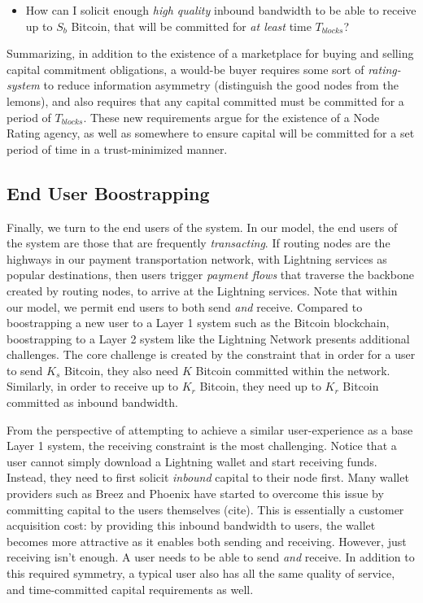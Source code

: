 \documentclass[10pt,a4paper]{article}
\theoremstyle{definition}
\begin{document}
\begin{itemize}
        \item How can I solicit enough \emph{high quality} inbound bandwidth
             to be able to receive up to $S_b$ Bitcoin, that
            will be committed for \emph{at least} time $T_{blocks}$? 
\end{itemize} 

Summarizing, in addition to the existence of a marketplace for buying and selling
capital commitment obligations, a would-be buyer requires some sort of
\emph{rating-system} to reduce information asymmetry (distinguish the good
nodes from the lemons), and also requires that any capital committed must be
committed for a period of $T_{blocks}$. These new requirements argue for the
existence of a Node Rating agency, as well as somewhere to ensure capital will
be committed for a set period of time in a trust-minimized manner. 


\subsection{End User Boostrapping}

Finally, we turn to the end users of the system. In our model, the end users of
the system are those that are frequently \emph{transacting}. If routing nodes
are the highways in our payment transportation network, with Lightning
services as popular destinations, then users trigger \emph{payment flows} that
traverse the backbone created by routing nodes, to arrive at the Lightning
services. Note that within our model, we permit end users to both send
\emph{and} receive. Compared to boostrapping a new user to a Layer 1 system
such as the Bitcoin blockchain, boostrapping to a Layer 2 system like the
Lightning Network presents additional challenges. The core challenge is created
by the constraint that in order for a user to send $K_s$ Bitcoin, they also
need $K$ Bitcoin committed within the network. Similarly, in order to receive
up to $K_r$ Bitcoin, they need up to $K_r$ Bitcoin committed as inbound
bandwidth. 

From the perspective of attempting to achieve a similar
user-experience as a base Layer 1 system, the receiving constraint is the most
challenging. Notice that a user cannot simply download a Lightning wallet and
start receiving funds. Instead, they need to first solicit \emph{inbound}
capital to their node first. Many wallet providers such as Breez and Phoenix
have started to overcome this issue by committing capital to the users
themselves (cite). This is essentially a customer acquisition cost: by
providing this inbound bandwidth to users, the wallet becomes more attractive
as it enables both sending and receiving. However, just receiving isn't enough. 
A user needs to be able to send \emph{and} receive. In addition to this
required symmetry, a typical user also has all the same quality of service, and
time-committed capital requirements as well. 
\end{document}
